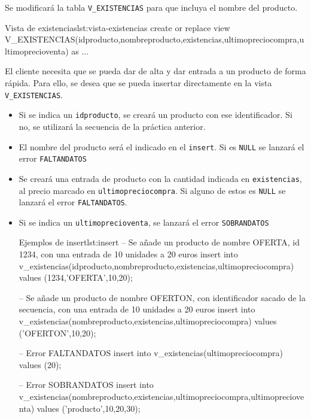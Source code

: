 \begin{homeworkProblem}

  Se modificará la tabla \texttt{V\_EXISTENCIAS} para que incluya el nombre del producto.

\begin{listadosql}{Vista de existencias}{lst:vista-existencias}
create or replace view V_EXISTENCIAS(idproducto,nombreproducto,existencias,ultimopreciocompra,ultimoprecioventa) as
...
\end{listadosql}  

  
  El cliente necesita que se pueda dar de alta y dar entrada a un producto de forma rápida. Para ello, se desea que se pueda insertar directamente en la vista \texttt{V\_EXISTENCIAS}.
  \begin{itemize}
  \item Si se indica un \texttt{idproducto}, se creará un producto con ese identificador. Si no, se utilizará la secuencia de la práctica anterior.
  \item El nombre del producto será el indicado en el \texttt{insert}. Si es \texttt{NULL} se lanzará el error \texttt{FALTANDATOS}
  \item Se creará una entrada de producto con la cantidad indicada en \texttt{existencias}, al precio marcado en \texttt{ultimopreciocompra}. Si alguno de estos es \texttt{NULL} se lanzará el error \texttt{FALTANDATOS}.
  \item Si se indica un \texttt{ultimoprecioventa}, se lanzará el error \texttt{SOBRANDATOS}

\begin{listadosql}{Ejemplos de insert}{lst:insert}
-- Se añade un producto de nombre OFERTA, id 1234, con una entrada de 10 unidades a 20 euros
insert into v_existencias(idproducto,nombreproducto,existencias,ultimopreciocompra) 
values (1234,'OFERTA',10,20);

-- Se añade un producto de nombre OFERTON, con identificador sacado de la secuencia, con una entrada de 10 unidades a 20 euros
insert into v_existencias(nombreproducto,existencias,ultimopreciocompra) 
values ('OFERTON',10,20);

-- Error FALTANDATOS
insert into v_existencias(ultimopreciocompra) values (20);

-- Error SOBRANDATOS
insert into v_existencias(nombreproducto,existencias,ultimopreciocompra,ultimoprecioventa) 
values ('producto',10,20,30);
\end{listadosql}
  \end{itemize}

\end{homeworkProblem}




